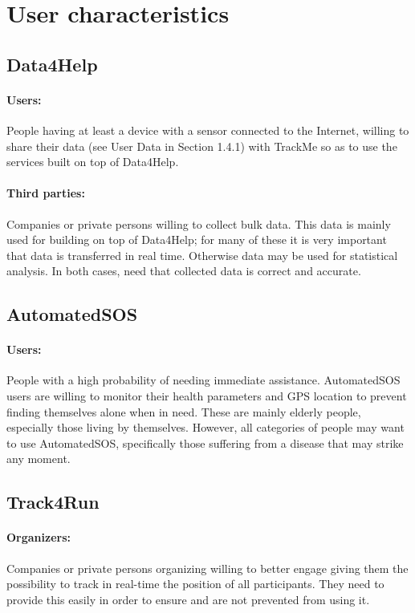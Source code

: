 \documentclass[../../rasd.tex]{subfiles}
\begin{document}
\section{User characteristics}
\subsection{Data4Help}
\paragraph{Users:}
	People having at least a device with a sensor connected to the Internet, willing to share their data (see User Data in Section 1.4.1) with TrackMe so as to use the services built on top of Data4Help.
\paragraph{Third parties:}
	Companies or private persons willing to collect bulk data. This data is mainly used for building  on top of Data4Help; for many of these  it is very important that data is transferred in real time. Otherwise data may be used for statistical analysis. In both cases,  need that collected data is correct and accurate.

\subsection{AutomatedSOS}
\paragraph{Users:}
	People with a high probability of needing immediate assistance. AutomatedSOS users are willing to monitor their health parameters and GPS location to prevent finding themselves alone when in need. These are mainly elderly people, especially those living by themselves. However, all categories of people may want to use AutomatedSOS, specifically those suffering from a disease that may strike any moment.

\subsection{Track4Run}
\paragraph{Organizers:}
	Companies or private persons organizing  willing to better engage  giving them the possibility to track in real-time the position of all participants. They need to provide this  easily in order to ensure  and  are not prevented from using it.
\end{document}
